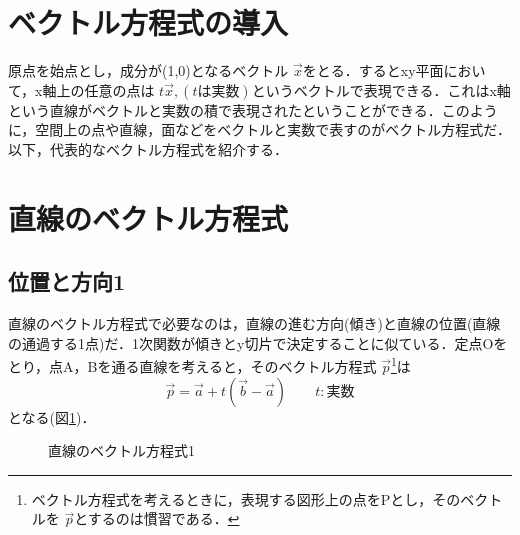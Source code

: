 \documentclass[dvipdfmx]{jsarticle}
\begin{document}
    \section{ベクトル方程式の導入}
    原点を始点とし，成分が(1,0)となるベクトル \(\vec{x}\)をとる．するとxy平面において，x軸上の任意の点は \(t\vec{x},(t\text{は実数})\)というベクトルで表現できる．これはx軸という直線がベクトルと実数の積で表現されたということができる．このように，空間上の点や直線，面などをベクトルと実数で表すのがベクトル方程式だ．以下，代表的なベクトル方程式を紹介する．

    \section{直線のベクトル方程式}
    \subsection{位置と方向1}

    直線のベクトル方程式で必要なのは，直線の進む方向(傾き)と直線の位置(直線の通過する1点)だ．1次関数が傾きとy切片で決定することに似ている．定点Oをとり，点A，Bを通る直線を考えると，そのベクトル方程式 \(\vec{p}\)\footnote{ベクトル方程式を考えるときに，表現する図形上の点をPとし，そのベクトルを \(\vec{p}\)とするのは慣習である．}は
    \[
    \vec{p}=\vec{a} + t(\vec{b}-\vec{a})\qquad t:\text{実数}
    \]
    となる(図\ref{tikz_vector_equation_line1})．

    \begin{figure}[htbp]\centering
        \caption{直線のベクトル方程式1}
        \label{tikz_vector_equation_line1}
    \end{figure}
\end{document}
